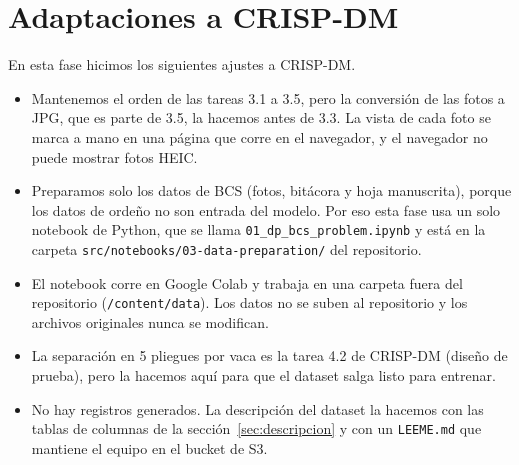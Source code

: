 \section*{Adaptaciones a CRISP-DM}

En esta fase hicimos los siguientes ajustes a CRISP-DM.

\begin{itemize}
  \item Mantenemos el orden de las tareas 3.1 a 3.5, pero la conversión de las fotos a JPG, que es parte de 3.5, la hacemos antes de 3.3. La vista de cada foto se marca a mano en una página que corre en el navegador, y el navegador no puede mostrar fotos HEIC.
  \item Preparamos solo los datos de BCS (fotos, bitácora y hoja manuscrita), porque los datos de ordeño no son entrada del modelo. Por eso esta fase usa un solo notebook de Python, que se llama \nolinkurl{01_dp_bcs_problem.ipynb} y está en la carpeta \nolinkurl{src/notebooks/03-data-preparation/} del repositorio.
  \item El notebook corre en Google Colab y trabaja en una carpeta fuera del repositorio (\nolinkurl{/content/data}). Los datos no se suben al repositorio y los archivos originales nunca se modifican.
  \item La separación en 5 pliegues por vaca es la tarea 4.2 de CRISP-DM (diseño de prueba), pero la hacemos aquí para que el dataset salga listo para entrenar.
  \item No hay registros generados. La descripción del dataset la hacemos con las tablas de columnas de la sección~\ref{sec:descripcion} y con un \nolinkurl{LEEME.md} que mantiene el equipo en el bucket de S3.
\end{itemize}
